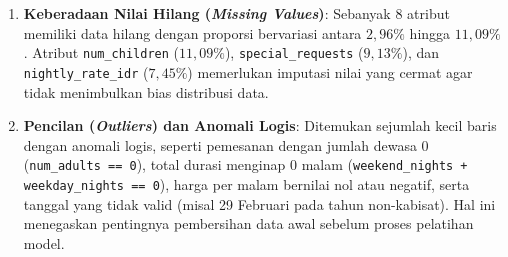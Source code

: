 \begin{enumerate}
\begin{itemize}
        \end{itemize}
  \item \textbf{Keberadaan Nilai Hilang (\textit{Missing Values})}:
        Sebanyak 8 atribut memiliki data hilang dengan proporsi bervariasi antara $2{,}96\%$ hingga $11{,}09\%$.
        Atribut \texttt{num\_children} ($11{,}09\%$), \texttt{special\_requests} ($9{,}13\%$), dan
        \texttt{nightly\_rate\_idr} ($7{,}45\%$) memerlukan imputasi nilai yang cermat agar tidak
        menimbulkan bias distribusi data.
  \item \textbf{Pencilan (\textit{Outliers}) dan Anomali Logis}:
        Ditemukan sejumlah kecil baris dengan anomali logis, seperti pemesanan dengan jumlah dewasa 0
        (\texttt{num\_adults == 0}), total durasi menginap 0 malam (\texttt{weekend\_nights + weekday\_nights == 0}),
        harga per malam bernilai nol atau negatif, serta tanggal yang tidak valid (misal 29 Februari pada tahun non-kabisat).
        Hal ini menegaskan pentingnya pembersihan data awal sebelum proses pelatihan model.
\end{enumerate}
